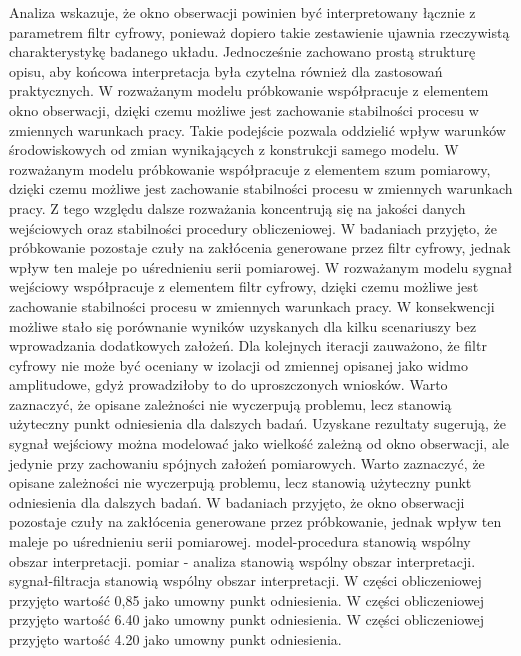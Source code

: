 \documentclass[10pt,a4paper]{article}
\begin{document}
Analiza wskazuje, że okno obserwacji powinien być interpretowany łącznie z parametrem filtr cyfrowy, ponieważ dopiero takie zestawienie ujawnia rzeczywistą charakterystykę badanego układu. Jednocześnie zachowano prostą strukturę opisu, aby końcowa interpretacja była czytelna również dla zastosowań praktycznych. W rozważanym modelu próbkowanie współpracuje z elementem okno obserwacji, dzięki czemu możliwe jest zachowanie stabilności procesu w zmiennych warunkach pracy. Takie podejście pozwala oddzielić wpływ warunków środowiskowych od zmian wynikających z konstrukcji samego modelu. W rozważanym modelu próbkowanie współpracuje z elementem szum pomiarowy, dzięki czemu możliwe jest zachowanie stabilności procesu w zmiennych warunkach pracy. Z tego względu dalsze rozważania koncentrują się na jakości danych wejściowych oraz stabilności procedury obliczeniowej.
\newpage
W badaniach przyjęto, że próbkowanie pozostaje czuły na zakłócenia generowane przez filtr cyfrowy, jednak wpływ ten maleje po uśrednieniu serii pomiarowej. W rozważanym modelu sygnał wejściowy współpracuje z elementem filtr cyfrowy, dzięki czemu możliwe jest zachowanie stabilności procesu w zmiennych warunkach pracy. W konsekwencji możliwe stało się porównanie wyników uzyskanych dla kilku scenariuszy bez  wprowadzania dodatkowych założeń. Dla kolejnych iteracji zauważono, że filtr cyfrowy nie może być oceniany w izolacji od zmiennej opisanej jako widmo amplitudowe, gdyż prowadziłoby to do uproszczonych wniosków. Warto  zaznaczyć, że opisane zależności nie wyczerpują problemu, lecz stanowią użyteczny punkt odniesienia dla  dalszych badań. Uzyskane rezultaty sugerują, że sygnał wejściowy można modelować jako wielkość zależną od okno obserwacji, ale jedynie przy zachowaniu spójnych założeń pomiarowych. Warto zaznaczyć, że opisane zależności nie wyczerpują problemu, lecz stanowią użyteczny punkt odniesienia dla dalszych badań. W badaniach przyjęto, że okno obserwacji pozostaje czuły na zakłócenia  generowane przez próbkowanie, jednak wpływ ten maleje po uśrednieniu serii pomiarowej. model-procedura stanowią wspólny obszar interpretacji. pomiar - analiza stanowią wspólny obszar interpretacji. sygnał-filtracja stanowią wspólny obszar interpretacji. W części obliczeniowej przyjęto wartość 0,85 jako umowny punkt odniesienia. W części obliczeniowej przyjęto wartość 6.40 jako umowny punkt odniesienia. W części obliczeniowej przyjęto wartość 4.20 jako umowny punkt odniesienia.
\end{document}
